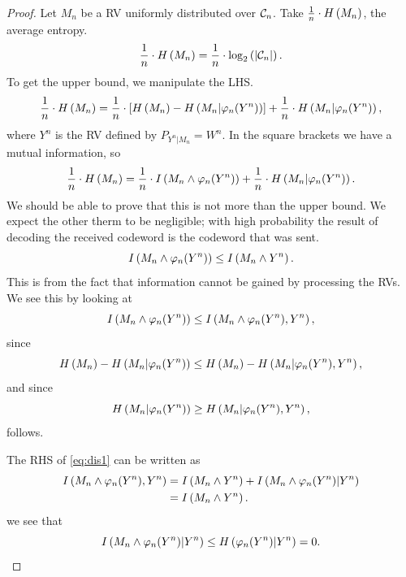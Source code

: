 \begin{proof}
	Let $M_n$ be a \ac{RV} uniformly distributed over $\mathcal{C}_n$.
	Take $\frac{1}{n} \cdot H\left({M_n}\right)$, the average entropy.
	\begin{equation*}
		\frac{1}{n} \cdot H\left({M_n}\right) =
		\frac{1}{n} \cdot \log_2 \left( {\left|{\mathcal{C}_n}\right|} \right).
	\end{equation*}
	To get the upper bound, we manipulate the \ac{LHS}.
	\begin{equation*}
		\frac{1}{n} \cdot H\left({M_n}\right) =
		\frac{1}{n} \cdot \left[ H\left({M_n}\right) - H\left({M_n | \varphi_n(Y^n)}\right) \right] +
		\frac{1}{n} \cdot H\left({M_n | \varphi_n(Y^n)}\right),
	\end{equation*}
	where $Y^n$ is the \ac{RV} defined by $P_{Y^n | M_n} = W^n$.
	In the square brackets we have a mutual information, so
	\begin{equation*}
		\frac{1}{n} \cdot H\left({M_n}\right) =
		\frac{1}{n} \cdot I \left( {M_n \land \varphi_n(Y^n)} \right) +
		\frac{1}{n} \cdot H\left({M_n | \varphi_n(Y^n)}\right).
	\end{equation*}
	We should be able to prove that this is not more than the upper bound.
	We expect the other therm to be negligible; with high probability the result of decoding the received codeword is the codeword that was sent.
	\begin{equation*}
		I \left( {M_n \land \varphi_n(Y^n)} \right) \le
		I \left( {M_n \land Y^n} \right).
	\end{equation*}
	This is from the fact that information cannot be gained by processing the \acp{RV}.
	We see this by looking at
	\begin{equation} \label{eq:dis1}
		I \left( {M_n \land \varphi_n(Y^n)} \right) \le
		I \left( {M_n \wedge \varphi_n(Y^n), Y^n} \right),
	\end{equation}
	since
	\begin{equation*}
		H\left({M_n}\right) - H\left({M_n | \varphi_n(Y^n)}\right) \le
		H\left({M_n}\right) - H\left({M_n | \varphi_n(Y^n), Y^n}\right),
	\end{equation*}
	and since
	\begin{equation*}
		H\left({M_n | \varphi_n(Y^n)}\right) \ge
		H\left({M_n | \varphi_n(Y^n), Y^n}\right),
	\end{equation*}
	 follows.

	The \ac{RHS} of \cref{eq:dis1} can be written as
	\begin{align*}
		I \left( {M_n \land \varphi_n(Y^n), Y^n} \right)
		& =
		I \left( {M_n \land Y^n} \right) +
		I \left( {M_n \land \varphi_n(Y^n) | Y^n} \right)
		\\
		& =
		I \left( {M_n \land Y^n} \right).
	\end{align*}
	we see that
	\begin{equation*}
		I \left( {M_n \land \varphi_n(Y^n) | Y^n} \right) \le
		H\left({\varphi_n(Y^n) | Y^n}\right) = 0.
	\end{equation*}


\end{proof}
